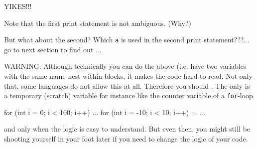 YIKES!!!

Note that the first print statement is not ambiguous. (Why?)

But what about the second? Which \texttt{a} is used in the second print statement???... go to next section to find out ...

WARNING: Although technically you can do the above (i.e. have two variables with the same name nest within blocks, it makes the code hard to read. Not only that, some languages do not allow this at all. Therefore you should . The only  is a temporary (scratch) variable for instance like the counter variable of a \texttt{for}-loop

\begin{console}
for (int i = 0; i < 100; i++)
{    
     ...
     for (int i = -10; i < 10; i++)
     {    
          ...
     }
     ...
}
\end{console}

and only when the logic is easy to understand. But even then, you might still be shooting yourself in your foot later if you need to change the logic of your code.

